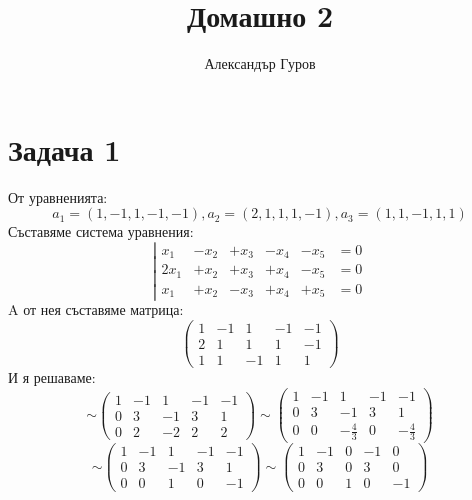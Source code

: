 \documentclass{article}
\title{Домашно 2}
\author{Александър Гуров}
\date{\datebulgarian{\today}}
\begin{document}
\maketitle

\section*{Задача 1} %
От уравненията:
\[
    a_1 = (1, -1, 1, -1, -1),  a_2 = (2, 1, 1, 1, -1),  a_3 = (1, 1, -1, 1, 1)
\]
Съставяме система уравнения:
\[
    \left| \begin{array}{cccccc}
        x_1   & - x_2 & + x_3 & - x_4 & - x_5 & =0 \\
        2 x_1 & + x_2 & + x_3 & + x_4 & - x_5 & =0 \\
        x_1   & + x_2 & - x_3 & + x_4 & + x_5 & =0
    \end{array}
    \right.
\]
A от нея съставяме матрица:
\[
    \left(
    \begin{array}{ccccc}
            1 & -1 & 1  & -1 & -1 \\
            2 & 1  & 1  & 1  & -1 \\
            1 & 1  & -1 & 1  & 1
        \end{array}
    \right)
\]
И я решаваме:
\[
    \sim\left(
    \begin{array}{ccccc}
            1 & -1 & 1  & -1 & -1 \\
            0 & 3  & -1 & 3  & 1  \\
            0 & 2  & -2 & 2  & 2
        \end{array}
    \right)
    \sim\left(
    \begin{array}{ccccc}
            1 & -1 & 1            & -1 & -1           \\
            0 & 3  & -1           & 3  & 1            \\
            0 & 0  & -\frac{4}{3} & 0  & -\frac{4}{3}
        \end{array}
    \right)
\]
\[
    \sim\left(
    \begin{array}{ccccc}
            1 & -1 & 1  & -1 & -1 \\
            0 & 3  & -1 & 3  & 1  \\
            0 & 0  & 1  & 0  & -1
        \end{array}
    \right)
    \sim\left(
    \begin{array}{ccccc}
            1 & -1 & 0 & -1 & 0  \\
            0 & 3  & 0 & 3  & 0  \\
            0 & 0  & 1 & 0  & -1
        \end{array}
    \right)
\]
\end{document}
